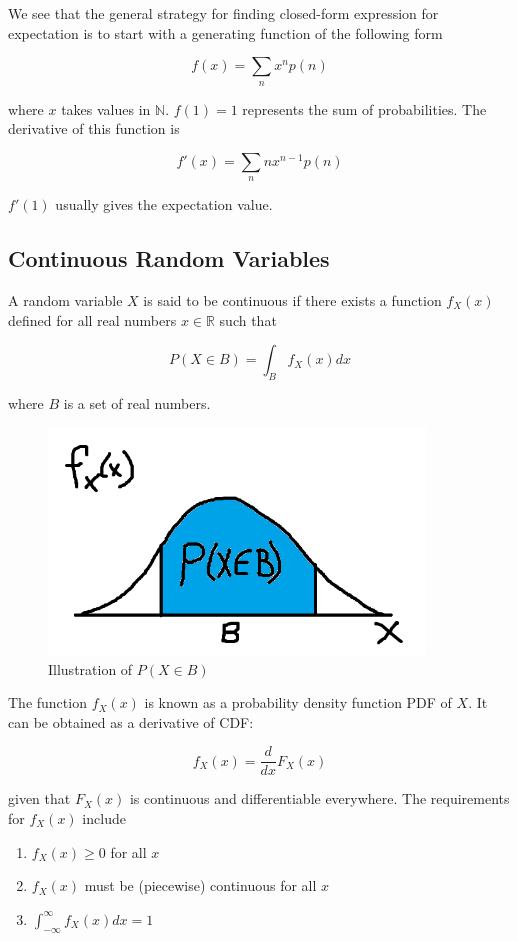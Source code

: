 \documentclass[12pt, a4paper]{article}
\begin{document}
We see that the general strategy for finding closed-form expression for expectation is to start with a generating function of the following form

$$f(x)=\sum_n x^n p(n)$$

where $x$ takes values in $\mathbb{N}$. $f(1)=1$ represents the sum of probabilities. The derivative of this function is

$$f'(x)=\sum_n nx^{n-1} p(n)$$

$f'(1)$ usually gives the expectation value.

\subsection{Continuous Random Variables}

A random variable $X$ is said to be continuous if there exists a function $f_X(x)$ defined for all real numbers $x\in\mathbb{R}$ such that

$$P(X\in B)=\int_B f_X(x) dx$$

where $B$ is a set of real numbers.

\begin{figure}[H]
\centering
\includegraphics[width=100mm]{12.png}
\caption{Illustration of $P(X\in B)$}
\end{figure}

The function $f_X(x)$ is known as a probability density function PDF of $X$. It can be obtained as a derivative of CDF:

$$f_X(x)=\frac{d}{dx}F_X(x)$$

given that $F_X(x)$ is continuous and differentiable everywhere. The requirements for $f_X(x)$ include

\begin{enumerate}[i]
  \item $f_X(x) \ge 0$ for all $x$
  \item $f_X(x)$ must be (piecewise) continuous for all $x$
  \item $\displaystyle \int_{-\infty}^\infty f_X(x) dx = 1$
\end{enumerate}
\end{document}
